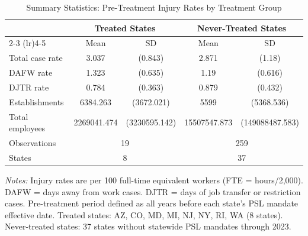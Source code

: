 \begin{table}[t]
\centering
\caption{Summary Statistics: Pre-Treatment Injury Rates by Treatment Group}
\label{tab:summary}
\begin{tabular}{lcccc}
\toprule
 & \multicolumn{2}{c}{Treated States} & \multicolumn{2}{c}{Never-Treated States} \\
\cmidrule(lr){2-3} \cmidrule(lr){4-5}
 & Mean & SD & Mean & SD \\
\midrule
Total case rate & 3.037 & (0.843) & 2.871 & (1.18) \\
DAFW rate & 1.323 & (0.635) & 1.19 & (0.616) \\
DJTR rate & 0.784 & (0.363) & 0.879 & (0.432) \\
Establishments & 6384.263 & (3672.021) & 5599 & (5368.536) \\
Total employees & 2269041.474 & (3230595.142) & 15507547.873 & (149088487.583) \\
\midrule
Observations & \multicolumn{2}{c}{19} & \multicolumn{2}{c}{259} \\
States & \multicolumn{2}{c}{8} & \multicolumn{2}{c}{37} \\
\bottomrule
\end{tabular}
\begin{tablenotes}
\small
\item \textit{Notes:} Injury rates are per 100 full-time equivalent workers (FTE = hours/2,000). DAFW = days away from work cases. DJTR = days of job transfer or restriction cases. Pre-treatment period defined as all years before each state's PSL mandate effective date. Treated states: AZ, CO, MD, MI, NJ, NY, RI, WA (8 states). Never-treated states: 37 states without statewide PSL mandates through 2023.
\end{tablenotes}
\end{table}
